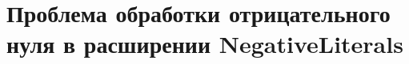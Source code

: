 \section[Проблема в расширении NegativeLiterals]
{Проблема обработки отрицательного нуля в расширении NegativeLiterals}

